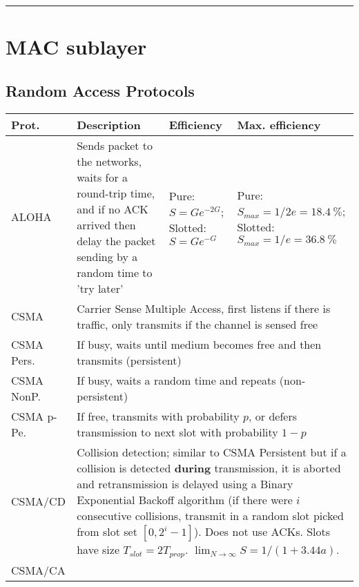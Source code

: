 \documentclass{form}
\begin{document}
\noindent\rule{\textwidth}{0.4pt}\vspace{-1.5em}

\section*{MAC sublayer}
\subsection*{Random Access Protocols}
\begin{center}
    \begin{tabular}{p{21mm} | p{85mm} | p{30mm} | p{46mm}}
        \textbf{Prot.} & \textbf{Description}                                                                                                                           & \textbf{Efficiency}                      & \textbf{Max. efficiency}                                                             \\ \hline
        ALOHA          & Sends packet to the networks, waits for a round-trip time, and if no ACK arrived then delay the packet sending by a random time to 'try later' & Pure: $S=Ge^{-2G}$; Slotted: $S=Ge^{-G}$ & Pure: $S_{max}=1/2e=\SI{18.4}{\percent}$; Slotted: $S_{max}=1/e=\SI{36.8}{\percent}$ \\
        CSMA           & \multicolumn{3}{p{170mm}}{Carrier Sense Multiple Access, first listens if there is traffic, only transmits if the channel is sensed free            } \\
        CSMA Pers.     & \multicolumn{3}{p{170mm}}{If busy, waits until medium becomes free and then transmits (persistent)                                                  } \\
        CSMA NonP.     & \multicolumn{3}{p{170mm}}{If busy, waits a random time and repeats (non-persistent)                                                                 } \\
        CSMA p-Pe.     & \multicolumn{3}{p{170mm}}{If free, transmits with probability $p$, or defers transmission to next slot with probability $1-p$                       } \\
        CSMA/CD        & \multicolumn{3}{p{170mm}}{Collision detection; similar to CSMA Persistent but if a collision is detected \textbf{during} transmission, it is aborted and retransmission is delayed using a Binary Exponential Backoff algorithm (if there were $i$ consecutive collisions, transmit in a random slot picked from slot set $[0, 2^i-1]$). Does not use ACKs. Slots have size $T_{slot}=2T_{prop}$. $\lim_{N \rightarrow\infty}{S}=1/(1+3.44a)$.} \\
        CSMA/CA        & \multicolumn{3}{p{170mm}}{} \\
    \end{tabular}
\end{center}
\end{document}
